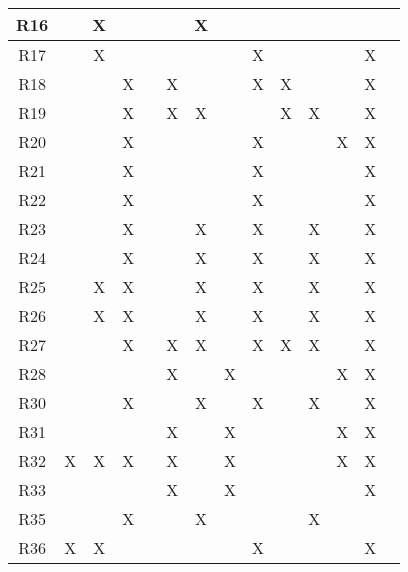\begin{table}[H]
\begin{tabular}{|c|c|c|c|c|c|c|c|c|c|c|c|c|c|}
\hline
{\cellcolor[rgb]{0.71,0.102,0}}R16 &    & X  &    &    &    & X  &    &    &    &     &      &     &      \\ 
\hline
{\cellcolor[rgb]{0.71,0.102,0}}R17 &    & X  &    &    &    &    &    & X  &    &     &      & X   &      \\ 
\hline
{\cellcolor[rgb]{0.71,0.102,0}}R18 &    &    & X  &    & X  &    &    & X  & X  &     &      & X   &      \\ 
\hline
{\cellcolor[rgb]{0.71,0.102,0}}R19 &    &    & X  &    & X  & X  &    &    & X  & X   &      & X   &      \\ 
\hline
{\cellcolor[rgb]{0.71,0.102,0}}R20 &    &    & X  &    &    &    &    & X  &    &     & X    & X   &      \\ 
\hline
{\cellcolor[rgb]{0.71,0.102,0}}R21 &    &    & X  &    &    &    &    & X  &    &     &      & X   &      \\ 
\hline
{\cellcolor[rgb]{0.71,0.102,0}}R22 &    &    & X  &    &    &    &    & X  &    &     &      & X   &      \\ 
\hline
{\cellcolor[rgb]{0.71,0.102,0}}R23 &    &    & X  &    &    & X  &    & X  &    & X   &      & X   &      \\ 
\hline
{\cellcolor[rgb]{0.71,0.102,0}}R24 &    &    & X  &    &    & X  &    & X  &    & X   &      & X   &      \\ 
\hline
{\cellcolor[rgb]{0.71,0.102,0}}R25 &    & X  & X  &    &    & X  &    & X  &    & X   &      & X   &      \\ 
\hline
{\cellcolor[rgb]{0.71,0.102,0}}R26 &    & X  & X  &    &    & X  &    & X  &    & X   &      & X   &      \\ 
\hline
{\cellcolor[rgb]{0.71,0.102,0}}R27 &    &    & X  &    & X  & X  &    & X  & X  & X   &      & X   &      \\ 
\hline
{\cellcolor[rgb]{0.71,0.102,0}}R28 &    &    &    &    & X  &    & X  &    &    &     & X    & X   &      \\ 
\hline
{\cellcolor[rgb]{0.71,0.102,0}}R30 &    &    & X  &    &    & X  &    & X  &    & X   &      & X   &      \\ 
\hline
{\cellcolor[rgb]{0.71,0.102,0}}R31 &    &    &    &    & X  &    & X  &    &    &     & X    & X   &      \\ 
\hline
{\cellcolor[rgb]{0.71,0.102,0}}R32 & X  & X  & X  &    & X  &    & X  &    &    &     & X    & X   &      \\ 
\hline
{\cellcolor[rgb]{0.71,0.102,0}}R33 &    &    &    &    & X  &    & X  &    &    &     &      & X   &      \\ 
\hline
{\cellcolor[rgb]{0.71,0.102,0}}R35 &    &    & X  &    &    & X  &    &    &    & X   &      &     &      \\ 
\hline
{\cellcolor[rgb]{0.71,0.102,0}}R36 & X  & X  &    &    &    &    &    & X  &    &     &      & X   &      \\ 
\hline
\end{tabular}
\end{table}
\newpage

